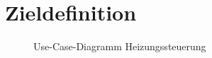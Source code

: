 \section{Zieldefinition}\label{Zieldefinition}

\begin{figure}[htb]
\centering
{}
\caption{Use-Case-Diagramm Heizungssteuerung}
\label{fig:UC}
\end{figure}